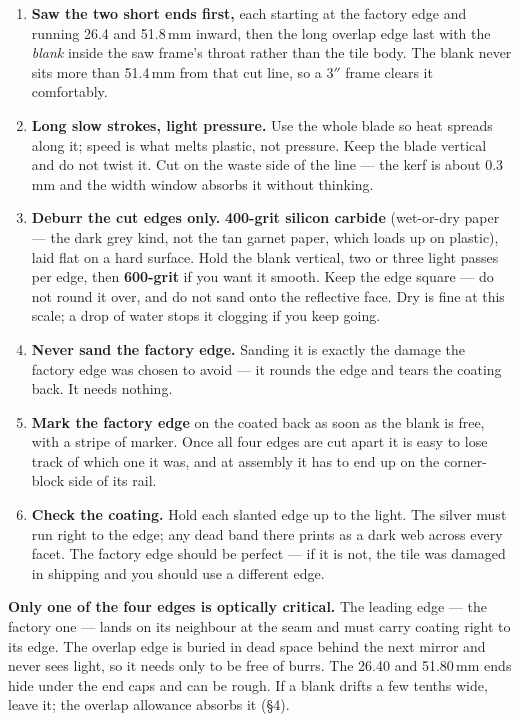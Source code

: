 \documentclass[letterpaper,11pt]{article}
\begin{document}
\begin{enumerate}[leftmargin=*]
      the piece cracks. A bench pin is ideal; otherwise clamp the tile between two pieces of
      scrap hardboard right up against the cut line.
\item \textbf{Saw the two short ends first,} each starting at the factory edge and running
      26.4 and 51.8\,mm inward, then the long overlap edge last with the \emph{blank} inside
      the saw frame's throat rather than the tile body. The blank never sits more than
      51.4\,mm from that cut line, so a 3$''$ frame clears it comfortably.
\item \textbf{Long slow strokes, light pressure.} Use the whole blade so heat spreads along
      it; speed is what melts plastic, not pressure. Keep the blade vertical and do not
      twist it. Cut on the waste side of the line --- the kerf is about 0.3\,mm and the width
      window absorbs it without thinking.
\item \textbf{Deburr the cut edges only.} \textbf{400-grit silicon carbide} (wet-or-dry
      paper --- the dark grey kind, not the tan garnet paper, which loads up on plastic),
      laid flat on a hard surface. Hold the blank vertical, two or three light passes per
      edge, then \textbf{600-grit} if you want it smooth. Keep the edge square --- do not
      round it over, and do not sand onto the reflective face. Dry is fine at this scale; a
      drop of water stops it clogging if you keep going.
\item \textbf{Never sand the factory edge.} Sanding it is exactly the damage the factory
      edge was chosen to avoid --- it rounds the edge and tears the coating back. It needs
      nothing.
\item \textbf{Mark the factory edge} on the coated back as soon as the blank is free, with a
      stripe of marker. Once all four edges are cut apart it is easy to lose track of which
      one it was, and at assembly it has to end up on the corner-block side of its rail.
\item \textbf{Check the coating.} Hold each slanted edge up to the light. The silver must
      run right to the edge; any dead band there prints as a dark web across every facet.
      The factory edge should be perfect --- if it is not, the tile was damaged in shipping
      and you should use a different edge.
\end{enumerate}

\textbf{Only one of the four edges is optically critical.} The leading edge --- the factory
one --- lands on its neighbour at the seam and must carry coating right to its edge. The
overlap edge is buried in dead space behind the next mirror and never sees light, so it
needs only to be free of burrs. The 26.40 and 51.80\,mm ends hide under the end caps and can
be rough. If a blank drifts a few tenths wide, leave it; the overlap allowance absorbs it
(\S4).
\end{document}
